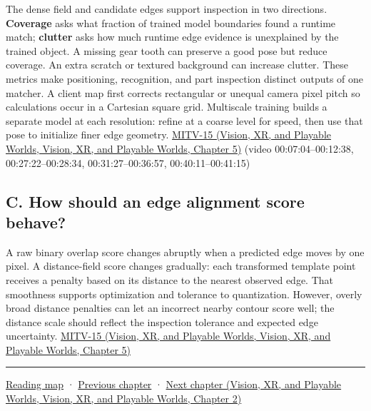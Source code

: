 The dense field and candidate edges support inspection in two directions. \textbf{Coverage} asks what fraction of trained model boundaries found a runtime match; \textbf{clutter} asks how much runtime edge evidence is unexplained by the trained object. A missing gear tooth can preserve a good pose but reduce coverage. An extra scratch or textured background can increase clutter. These metrics make positioning, recognition, and part inspection distinct outputs of one matcher. A client map first corrects rectangular or unequal camera pixel pitch so calculations occur in a Cartesian square grid. Multiscale training builds a separate model at each resolution: refine at a coarse level for speed, then use that pose to initialize finer edge geometry. \href{../07-Vision-XR-and-Playable-Worlds/main.pdf\#nameddest=04-visual-computing-ii-ch036-mitv-15---alignment-patmax-distance-field-filtering-and-sub-sampling-us-7065262}{MITV-15 (Vision, XR, and Playable Worlds, Vision, XR, and Playable Worlds, Chapter 5)} (video 00:07:04--00:12:38, 00:27:22--00:28:34, 00:31:27--00:36:57, 00:40:11--00:41:15)

\subsection{C. How should an edge alignment score behave?}\label{04-visual-computing-ii-ch030-c.-how-should-an-edge-alignment-score-behave}

A raw binary overlap score changes abruptly when a predicted edge moves by one pixel. A distance-field score changes gradually: each transformed template point receives a penalty based on its distance to the nearest observed edge. That smoothness supports optimization and tolerance to quantization. However, overly broad distance penalties can let an incorrect nearby contour score well; the distance scale should reflect the inspection tolerance and expected edge uncertainty. \href{../07-Vision-XR-and-Playable-Worlds/main.pdf\#nameddest=04-visual-computing-ii-ch036-mitv-15---alignment-patmax-distance-field-filtering-and-sub-sampling-us-7065262}{MITV-15 (Vision, XR, and Playable Worlds, Vision, XR, and Playable Worlds, Chapter 5)}

\begin{center}\rule{0.5\linewidth}{0.5pt}\end{center}

\hyperref[volume-reading-map]{Reading map} · \hyperref[04-visual-computing-ii-ch029-acceleration-structures-and-robust-queries]{Previous chapter} · \href{../07-Vision-XR-and-Playable-Worlds/main.pdf\#nameddest=04-visual-computing-ii-ch031-learning-a-visual-classifier}{Next chapter (Vision, XR, and Playable Worlds, Vision, XR, and Playable Worlds, Chapter 2)}
